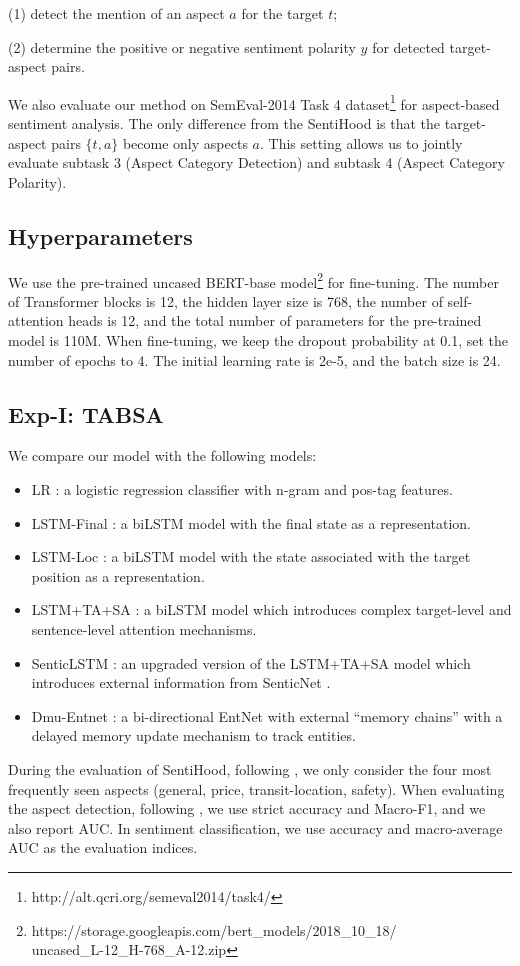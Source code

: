 \documentclass[11pt,a4paper]{article}
\theoremstyle{definition}
\begin{document}
	(1) detect the mention of an aspect $a$ for the target $t$;
	
	(2) determine the positive or negative sentiment polarity $y$ for detected target-aspect pairs.
	
	We also evaluate our method on SemEval-2014 Task 4 \cite{S14-2004} dataset\footnote{http://alt.qcri.org/semeval2014/task4/} for aspect-based sentiment analysis. The only difference from the SentiHood is that the target-aspect pairs $\{t,a\}$ become only aspects $a$. This setting allows us to jointly evaluate subtask 3 (Aspect Category Detection) and subtask 4 (Aspect Category Polarity).
	
	\subsection{Hyperparameters}
	We use the pre-trained uncased BERT-base model\footnote{https://storage.googleapis.com/bert\_models/2018\_10\_18/\\uncased\_L-12\_H-768\_A-12.zip} for fine-tuning. The number of Transformer blocks is 12, the hidden layer size is 768, the number of self-attention heads is 12, and the total number of parameters for the pre-trained model is 110M. When fine-tuning, we keep the dropout probability at 0.1, set the number of epochs to 4. The initial learning rate is 2e-5, and the batch size is 24.
	
	\subsection{Exp-I: TABSA}
	We compare our model with the following models:
	\begin{itemize}
		\item
		LR \cite{saeidi2016sentihood}: a logistic regression classifier with n-gram and pos-tag features.
		\item
		LSTM-Final \cite{saeidi2016sentihood}: a biLSTM model with the final state as a representation.
		\item
		LSTM-Loc \cite{saeidi2016sentihood}: a biLSTM model with the state associated with the target position as a representation.
		\item
		LSTM+TA+SA \cite{ma2018targeted}: a biLSTM model which introduces complex target-level and sentence-level attention mechanisms.
		\item
		SenticLSTM \cite{ma2018targeted}: an upgraded version of the LSTM+TA+SA model which introduces external information from SenticNet \cite{cambria2016senticnet}.
		\item
		Dmu-Entnet \cite{liu2018recurrent}: a bi-directional EntNet \cite{henaff2016tracking} with external “memory chains” with a delayed memory update mechanism to track entities.
		
	\end{itemize}
	During the evaluation of SentiHood, following \citet{saeidi2016sentihood}, we only consider the four most frequently seen aspects (general, price, transit-location, safety). When evaluating the aspect detection, following \citet{ma2018targeted}, we use strict accuracy and Macro-F1, and we also report AUC.  In sentiment classification, we use accuracy and macro-average AUC as the evaluation indices.
	
\end{document}
